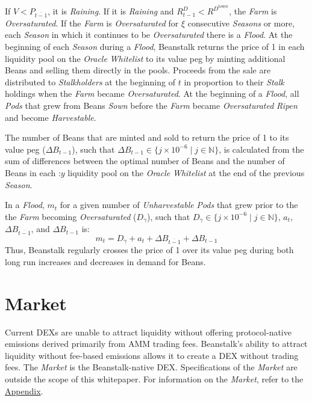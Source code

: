 \documentclass[tikz]{article}
\newcommand{\term}[1]{\textsl{#1}}
\newcommand{\Bean}{} %
\begin{document}
If $V < P_{\overline{t-1}}$, it is \term{Raining}. If it is \term{Raining} and $R^D_{t-1} < R^{D^{\text{lower}}}$, the \term{Farm} is \term{Oversaturated}. If the \term{Farm} is \term{Oversaturated} for $\xi$ consecutive \term{Seasons} or more, each \term{Season} in which it continues to be \term{Oversaturated} there is a \term{Flood}. At the beginning of each \term{Season} during a \term{Flood}, Beanstalk returns the price of \Bean1 in each liquidity pool on the \term{Oracle} \term{Whitelist} to its value peg by minting additional Beans and selling them directly in the pools. Proceeds from the sale are distributed to \term{Stalkholders} at the beginning of $t$ in proportion to their \term{Stalk} holdings when the \term{Farm} became \term{Oversaturated}. At the beginning of a \term{Flood}, all \term{Pods} that grew from Beans \term{Sown} before the \term{Farm} became \term{Oversaturated} \term{Ripen} and become \term{Harvestable}.

The number of Beans that are minted and sold to return the price of \Bean1 to its value peg ($\Delta B_{t-1}$), such that $\Delta B_{t-1} \in \{j \times 10^{-6} \mid j \in \mathbb{N} \}$, is calculated from the sum of differences between the optimal number of Beans and the number of Beans in each \Bean:$y$ liquidity pool on the \term{Oracle} \term{Whitelist} at the end of the previous \term{Season}.

\newpage
In a \term{Flood}, $m_t$ for a given number of \term{Unharvestable} \term{Pods} that grew prior to the the \term{Farm} becoming \term{Oversaturated} ($D_{\gamma}$), such that $D_{\gamma} \in \{j \times 10^{-6} \mid j \in \mathbb{N} \}$, $a_t$, $\Delta B_{\overline{t-1}}$, and $\Delta B_{t-1}$ is:
$$m_t = D_{\gamma} + a_t + \Delta B_{\overline{t-1}} + \Delta B_{t-1}$$
Thus, Beanstalk regularly crosses the price of \Bean1 over its value peg during both long run increases and decreases in demand for Beans.

\section{Market}
Current DEXs are unable to attract liquidity without offering protocol-native emissions derived primarily from AMM trading fees. Beanstalk's ability to attract liquidity without fee-based emissions allows it to create a DEX without trading fees. The \term{Market} is the Beanstalk-native DEX. Specifications of the \term{Market} are outside the scope of this whitepaper. For information on the \term{Market}, refer to the \hyperlink{section.12}{Appendix}.
\end{document}
